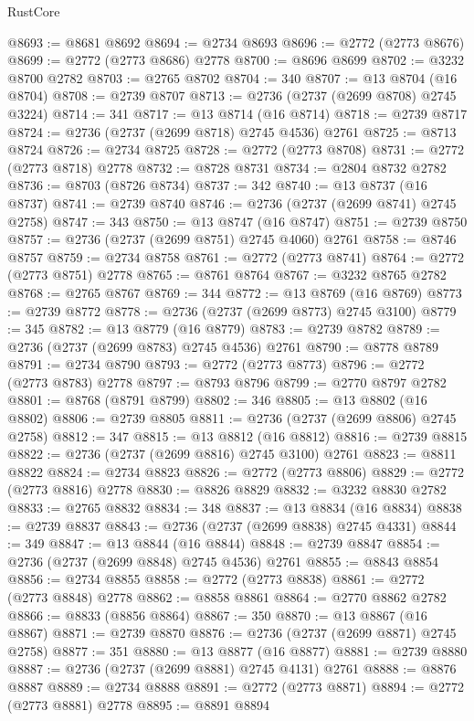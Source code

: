\begin{lexlean}{RustCore}
\begin{coremodule}
@8693 := @8681 @8692
@8694 := @2734 @8693
@8696 := @2772 (@2773 @8676)
@8699 := @2772 (@2773 @8686) @2778
@8700 := @8696 @8699
@8702 := @3232 @8700 @2782
@8703 := @2765 @8702
@8704 := 340
@8707 := @13 @8704 (@16 @8704)
@8708 := @2739 @8707
@8713 := @2736 (@2737 (@2699 @8708) @2745 @3224)
@8714 := 341
@8717 := @13 @8714 (@16 @8714)
@8718 := @2739 @8717
@8724 := @2736 (@2737 (@2699 @8718) @2745 @4536) @2761
@8725 := @8713 @8724
@8726 := @2734 @8725
@8728 := @2772 (@2773 @8708)
@8731 := @2772 (@2773 @8718) @2778
@8732 := @8728 @8731
@8734 := @2804 @8732 @2782
@8736 := @8703 (@8726 @8734)
@8737 := 342
@8740 := @13 @8737 (@16 @8737)
@8741 := @2739 @8740
@8746 := @2736 (@2737 (@2699 @8741) @2745 @2758)
@8747 := 343
@8750 := @13 @8747 (@16 @8747)
@8751 := @2739 @8750
@8757 := @2736 (@2737 (@2699 @8751) @2745 @4060) @2761
@8758 := @8746 @8757
@8759 := @2734 @8758
@8761 := @2772 (@2773 @8741)
@8764 := @2772 (@2773 @8751) @2778
@8765 := @8761 @8764
@8767 := @3232 @8765 @2782
@8768 := @2765 @8767
@8769 := 344
@8772 := @13 @8769 (@16 @8769)
@8773 := @2739 @8772
@8778 := @2736 (@2737 (@2699 @8773) @2745 @3100)
@8779 := 345
@8782 := @13 @8779 (@16 @8779)
@8783 := @2739 @8782
@8789 := @2736 (@2737 (@2699 @8783) @2745 @4536) @2761
@8790 := @8778 @8789
@8791 := @2734 @8790
@8793 := @2772 (@2773 @8773)
@8796 := @2772 (@2773 @8783) @2778
@8797 := @8793 @8796
@8799 := @2770 @8797 @2782
@8801 := @8768 (@8791 @8799)
@8802 := 346
@8805 := @13 @8802 (@16 @8802)
@8806 := @2739 @8805
@8811 := @2736 (@2737 (@2699 @8806) @2745 @2758)
@8812 := 347
@8815 := @13 @8812 (@16 @8812)
@8816 := @2739 @8815
@8822 := @2736 (@2737 (@2699 @8816) @2745 @3100) @2761
@8823 := @8811 @8822
@8824 := @2734 @8823
@8826 := @2772 (@2773 @8806)
@8829 := @2772 (@2773 @8816) @2778
@8830 := @8826 @8829
@8832 := @3232 @8830 @2782
@8833 := @2765 @8832
@8834 := 348
@8837 := @13 @8834 (@16 @8834)
@8838 := @2739 @8837
@8843 := @2736 (@2737 (@2699 @8838) @2745 @4331)
@8844 := 349
@8847 := @13 @8844 (@16 @8844)
@8848 := @2739 @8847
@8854 := @2736 (@2737 (@2699 @8848) @2745 @4536) @2761
@8855 := @8843 @8854
@8856 := @2734 @8855
@8858 := @2772 (@2773 @8838)
@8861 := @2772 (@2773 @8848) @2778
@8862 := @8858 @8861
@8864 := @2770 @8862 @2782
@8866 := @8833 (@8856 @8864)
@8867 := 350
@8870 := @13 @8867 (@16 @8867)
@8871 := @2739 @8870
@8876 := @2736 (@2737 (@2699 @8871) @2745 @2758)
@8877 := 351
@8880 := @13 @8877 (@16 @8877)
@8881 := @2739 @8880
@8887 := @2736 (@2737 (@2699 @8881) @2745 @4131) @2761
@8888 := @8876 @8887
@8889 := @2734 @8888
@8891 := @2772 (@2773 @8871)
@8894 := @2772 (@2773 @8881) @2778
@8895 := @8891 @8894

\end{coremodule}
\end{lexlean}
